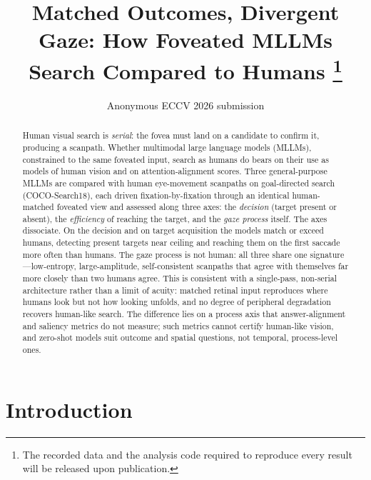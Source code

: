 \documentclass[runningheads]{llncs}
\begin{document}
\title{Matched Outcomes, Divergent Gaze: How Foveated MLLMs Search Compared to Humans \thanks{The recorded data and the analysis code required to reproduce every result will be released upon publication.}}

\author{Anonymous ECCV 2026 submission}
\maketitle



\begin{abstract}
Human visual search is \emph{serial}: the fovea must land on a candidate to confirm it, producing a
scanpath. Whether multimodal large language models (MLLMs), constrained to the same foveated input, search
as humans do bears on their use as models of human vision and on attention-alignment scores. Three
general-purpose MLLMs are compared with human eye-movement scanpaths on goal-directed search
(COCO-Search18), each driven fixation-by-fixation through an identical human-matched foveated view and
assessed along three axes: the \emph{decision} (target present or absent), the \emph{efficiency} of
reaching the target, and the \emph{gaze process} itself. The axes dissociate. On the decision and on
target acquisition the models match or exceed humans, detecting present targets near ceiling and reaching them on
the first saccade more often than humans. The gaze process is not human: all three share one
signature---low-entropy, large-amplitude, self-consistent scanpaths that agree with themselves far more
closely than two humans agree. This is consistent with a single-pass, non-serial architecture rather than
a limit of acuity: matched retinal input reproduces where humans look but not how looking unfolds, and no
degree of peripheral degradation recovers human-like search. The difference lies on a process axis that
answer-alignment and saliency metrics do not measure; such metrics cannot certify human-like vision, and
zero-shot models suit outcome and spatial questions, not temporal, process-level ones.
\end{abstract}




\section{Introduction}
\end{document}
